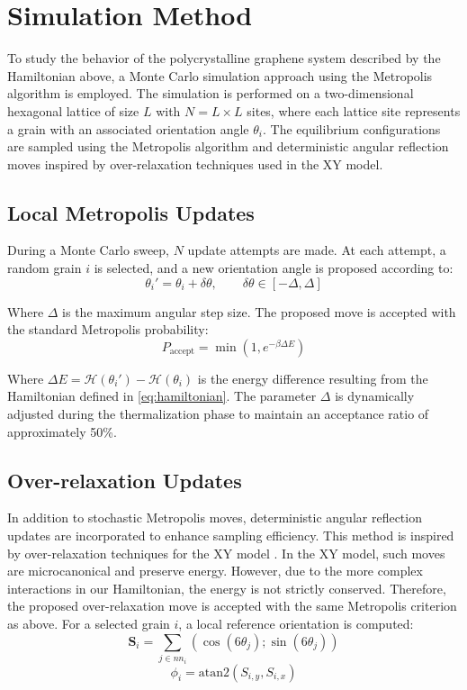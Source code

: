 \section{Simulation Method}

To study the behavior of the polycrystalline graphene system described by the Hamiltonian above, a Monte Carlo simulation approach using the Metropolis algorithm is employed. The simulation is performed on a two-dimensional hexagonal lattice of size $L$ with $N = L \times L$ sites, where each lattice site represents a grain with an associated orientation angle $\theta_i$. The equilibrium configurations are sampled using the Metropolis algorithm and deterministic angular reflection moves inspired by over-relaxation techniques used in the XY model. 

\subsection{Local Metropolis Updates}

During a Monte Carlo sweep, $N$ update attempts are made. At each attempt, a random grain $i$ is selected, and a new orientation angle is proposed according to:
\begin{equation}
    \theta_i' = \theta_i + \delta \theta,
    \qquad
    \delta \theta \in [-\Delta, \Delta]
\end{equation}

Where $\Delta$ is the maximum angular step size. The proposed move is accepted with the standard Metropolis probability:
\begin{equation}
    P_{\text{accept}} = \min\left(1, e^{-\beta \Delta E}\right)
\end{equation}

Where $\Delta E = \mathcal{H}(\theta_i') - \mathcal{H}(\theta_i)$ is the energy difference resulting from the Hamiltonian defined in \cref{eq:hamiltonian}. The parameter $\Delta$ is dynamically adjusted during the thermalization phase to maintain an acceptance ratio of approximately 50\%.

\subsection{Over-relaxation Updates}

In addition to stochastic Metropolis moves, deterministic angular reflection updates are incorporated to enhance sampling efficiency. This method is inspired by over-relaxation techniques for the XY model \cite{Krauth2006}. In the XY model, such moves are microcanonical and preserve energy. However, due to the more complex interactions in our Hamiltonian, the energy is not strictly conserved. Therefore, the proposed over-relaxation move is accepted with the same Metropolis criterion as above. For a selected grain $i$, a local reference orientation is computed:
\begin{equation}
    \mathbf{S}_i = \sum_{j \in nn_i} \left( \cos(6 \theta_j) ; \sin(6 \theta_j) \right)
\end{equation}
\begin{equation}
    \phi_i = \mathrm{atan2}(S_{i,y}, S_{i,x})
\end{equation}

